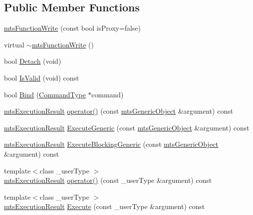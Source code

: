 \subsection*{Public Member Functions}
\begin{DoxyCompactItemize}
\item 
\hyperlink{classmts_function_write_a2c89c104fe66415fee44e7e0432c1169}{mts\+Function\+Write} (const bool is\+Proxy=false)
\item 
virtual \hyperlink{classmts_function_write_a3fa79d1d185c75ed9de6183867baf4d8}{$\sim$mts\+Function\+Write} ()
\item 
bool \hyperlink{classmts_function_write_a5d12c15fbc7bba0fb783330c5d6c69fe}{Detach} (void)
\item 
bool \hyperlink{classmts_function_write_a30285c8f7b9f5a8763b7dfa5f71e4d87}{Is\+Valid} (void) const 
\item 
bool \hyperlink{classmts_function_write_ac7a1185a062f2d9688dd7c88b1b85f35}{Bind} (\hyperlink{classmts_function_write_a4b81286be87adec18b358ebaa9ebb2be}{Command\+Type} $\ast$command)
\item 
\hyperlink{classmts_execution_result}{mts\+Execution\+Result} \hyperlink{classmts_function_write_ab60d432bb548395daa6d5d507a862ea1}{operator()} (const \hyperlink{classmts_generic_object}{mts\+Generic\+Object} \&argument) const 
\item 
\hyperlink{classmts_execution_result}{mts\+Execution\+Result} \hyperlink{classmts_function_write_a982352c95740e327e802c06dc3c9e4cf}{Execute\+Generic} (const \hyperlink{classmts_generic_object}{mts\+Generic\+Object} \&argument) const 
\item 
\hyperlink{classmts_execution_result}{mts\+Execution\+Result} \hyperlink{classmts_function_write_ab6c1d3a03e3fe06527da35598f660524}{Execute\+Blocking\+Generic} (const \hyperlink{classmts_generic_object}{mts\+Generic\+Object} \&argument) const 
\item 
{\footnotesize template$<$class \+\_\+user\+Type $>$ }\\\hyperlink{classmts_execution_result}{mts\+Execution\+Result} \hyperlink{classmts_function_write_af52b6e7e9c1b0a2f04574da77b478d2f}{operator()} (const \+\_\+user\+Type \&argument) const 
\item 
{\footnotesize template$<$class \+\_\+user\+Type $>$ }\\\hyperlink{classmts_execution_result}{mts\+Execution\+Result} \hyperlink{classmts_function_write_a79f0bfa0e2cf1d96aa93bf4876406437}{Execute} (const \+\_\+user\+Type \&argument) const 

\end{DoxyCompactItemize}
